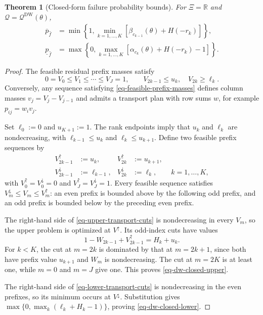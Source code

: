 \documentclass[review,11pt,3p,authoryear,nopreprintline]{elsarticle}
\newtheorem{theorem}{Theorem}
\begin{document}
\begin{theorem}[Closed-form failure probability bounds]
  \label{thm-closed-form-bounds}
  For $\Xi=\mathbb R$ and $\mathscr Q=\mathscr Q^{\mathrm{DW}}(\theta)$,
  \begin{align}
    \overline p_{\hat f}
    &=\min\left\{1,\min_{k=1,\ldots,K}
    \left[\beta_{c_{k-1}}(\theta)+H(-r_k)\right]\right\},
    \label{eq-dw-closed-upper}\\
    \underline p_{\hat f}
    &=\max\left\{0,\max_{k=1,\ldots,K}
    \left[\alpha_{c_k}(\theta)+H(-r_k)-1\right]\right\}.
    \label{eq-dw-closed-lower}
  \end{align}
\end{theorem}
\begin{proof}
  The feasible residual prefix masses satisfy
  \begin{equation}
    0=V_0\le V_1\le\cdots\le V_J=1,\qquad
    V_{2k-1}\le u_k,\quad V_{2k}\ge\ell_k.
    \label{eq-feasible-prefix-masses}
  \end{equation}
  Conversely, any sequence satisfying \eqref{eq-feasible-prefix-masses} defines column masses $v_j=V_j-V_{j-1}$ and admits a transport plan with row sums $w$, for example $p_{ij}=w_i v_j$.

  Set $\ell_0:=0$ and $u_{K+1}:=1$. The rank endpoints imply that $u_k$ and $\ell_k$ are nondecreasing, with $\ell_{k-1}\le u_k$ and $\ell_k\le u_{k+1}$. Define two feasible prefix sequences by
  \begin{equation}
    \begin{aligned}
      V^\uparrow_{2k-1}&:=u_k,&
      V^\uparrow_{2k}&:=u_{k+1},\\
      V^\downarrow_{2k-1}&:=\ell_{k-1},&
      V^\downarrow_{2k}&:=\ell_k,
      \qquad k=1,\ldots,K,
    \end{aligned}
    \label{eq-extreme-prefix-vectors}
  \end{equation}
  with $V^\uparrow_0=V^\downarrow_0=0$ and
  $V^\uparrow_J=V^\downarrow_J=1$.
  Every feasible sequence satisfies
  $V^\downarrow_m\le V_m\le V^\uparrow_m$:
  an even prefix is bounded above by the following odd prefix, and an odd prefix is bounded below by the preceding even prefix.

  The right-hand side of \eqref{eq-upper-transport-cuts} is nondecreasing in every $V_m$, so the upper problem is optimized at $V^\uparrow$. Its odd-index cuts have values
  \[
    1-W_{2k-1}+V^\uparrow_{2k-1}=H_k+u_k.
  \]
  For $k<K$, the cut at $m=2k$ is dominated by that at $m=2k+1$, since both have prefix value $u_{k+1}$ and $W_m$ is nondecreasing. The cut at $m=2K$ is at least one, while $m=0$ and $m=J$ give one. This proves \eqref{eq-dw-closed-upper}.

  The right-hand side of \eqref{eq-lower-transport-cuts} is nondecreasing in the even prefixes, so its minimum occurs at $V^\downarrow$. Substitution gives
  $\max\{0,\max_k(\ell_k+H_k-1)\}$, proving \eqref{eq-dw-closed-lower}.
\end{proof}
\end{document}
